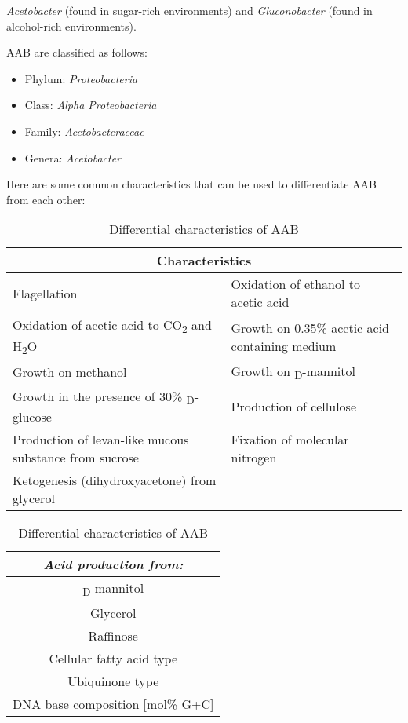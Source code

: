 \textit{Acetobacter} (found in sugar-rich environments) and \textit{Gluconobacter} (found in alcohol-rich environments).

AAB are classified as follows:
\begin{itemize}
    \item Phylum: \textit{Proteobacteria}
    \item Class: \textit{Alpha Proteobacteria}
    \item Family: \textit{Acetobacteraceae}
    \item Genera: \textit{Acetobacter}
\end{itemize}
Here are some common characteristics that can be used to differentiate AAB from each other:
\begin{table}[h]
    \centering
    \caption{Differential characteristics of AAB} 
    \label{tab:EA-AAB1.1}
            \begin{tabularx}{\textwidth}{ll} %
                \multicolumn{2}{c}{\textbf{Characteristics}} \\
                \hline
                Flagellation & Oxidation of ethanol to acetic acid \\
                Oxidation of acetic acid to CO\textsubscript{2} and H\textsubscript{2}O & Growth on 0.35\% acetic acid-containing medium \\
                 Growth on methanol & Growth on \textsubscript{D}-mannitol\\
                Growth in the presence of 30\% \textsubscript{D}-glucose & Production of cellulose \\
                Production of levan-like mucous substance from sucrose & Fixation of molecular nitrogen\\
                Ketogenesis (dihydroxyacetone) from glycerol & \\
                \hline
            \end{tabularx}

            \begin{tabular}{c}
                \textit{Acid production from:} \\
                \hline
                \textsubscript{D}-mannitol\\
                Glycerol\\
                Raffinose \\
                Cellular fatty acid type \\
                Ubiquinone type \\ 
                DNA base composition [mol\% G+C] \\
            \end{tabular}
\end{table}

